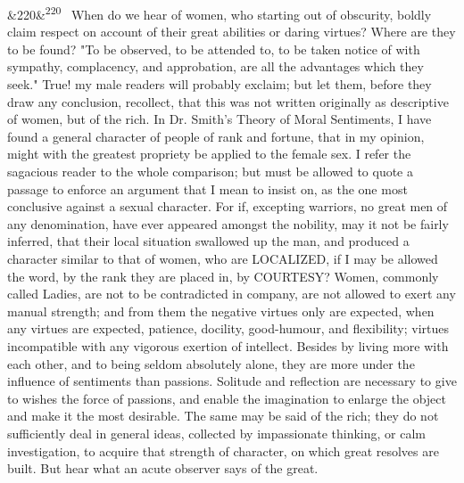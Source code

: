 \documentclass[12pt]{article}
\newcommand{\para}[1][]{\par\noindent\ifx&#1&\else\textsuperscript{\footnotesize #1}~\fi}
\begin{document}
\para[220] When do we hear of women, who starting out of obscurity, boldly claim respect on account of their great abilities or daring virtues? Where are they to be found? "To be observed, to be attended to, to be taken notice of with sympathy, complacency, and approbation, are all the advantages which they seek." True! my male readers will probably exclaim; but let them, before they draw any conclusion, recollect, that this was not written originally as descriptive of women, but of the rich. In Dr. Smith's Theory of Moral Sentiments, I have found a general character of people of rank and fortune, that in my opinion, might with the greatest propriety be applied to the female sex. I refer the sagacious reader to the whole comparison; but must be allowed to quote a passage to enforce an argument that I mean to insist on, as the one most conclusive against a sexual character. For if, excepting warriors, no great men of any denomination, have ever appeared amongst the nobility, may it not be fairly inferred, that their local situation swallowed up the man, and produced a character similar to that of women, who are LOCALIZED, if I may be allowed the word, by the rank they are placed in, by COURTESY? Women, commonly called Ladies, are not to be contradicted in company, are not allowed to exert any manual strength; and from them the negative virtues only are expected, when any virtues are expected, patience, docility, good-humour, and flexibility; virtues incompatible with any vigorous exertion of intellect. Besides by living more with each other, and to being seldom absolutely alone, they are more under the influence of sentiments than passions. Solitude and reflection are necessary to give to wishes the force of passions, and enable the imagination to enlarge the object and make it the most desirable. The same may be said of the rich; they do not sufficiently deal in general ideas, collected by impassionate thinking, or calm investigation, to acquire that strength of character, on which great resolves are built. But hear what an acute observer says of the great.
\end{document}
